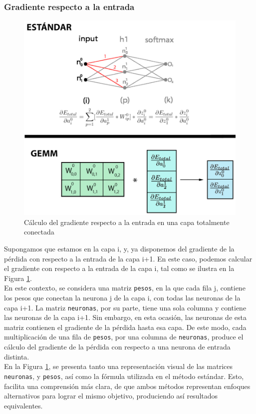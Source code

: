 \subsubsection{Gradiente respecto a la entrada}
\begin{figure}[H]
	\centering
	\includegraphics[scale=0.35]{imagenes/gemm_fully_back_input.jpg}  
	\caption{Cálculo del gradiente respecto a la entrada en una capa totalmente conectada}
	\label{fig:gemm_fully_back_input}
\end{figure}

Supongamos que estamos en la capa i, y, ya disponemos del gradiente de la pérdida con respecto a la entrada de la capa i+1. En este caso, podemos calcular el gradiente con respecto a la entrada de la capa i, tal como se ilustra en la Figura \ref{fig:gemm_fully_back_input}. \\
En este contexto, se considera una matriz \texttt{pesos}, en la que cada fila j, contiene los pesos que conectan la neurona j de la capa i, con todas las neuronas de la capa i+1. La matriz \texttt{neuronas}, por su parte, tiene una sola columna y contiene las neuronas de la capa i+1. Sin embargo, en esta ocasión, las neuronas de esta matriz contienen el gradiente de la pérdida hasta esa capa. De este modo, cada multiplicación de una fila de \texttt{pesos}, por una columna de \texttt{neuronas}, produce el cálculo del gradiente de la pérdida con respecto a una neurona de entrada distinta. \\
En la Figura \ref{fig:gemm_fully_back_input}, se presenta tanto una representación visual de las matrices \texttt{neuronas}, y \texttt{pesos}, así como la fórmula utilizada en el método estándar. Esto, facilita una comprensión más clara, de que ambos métodos representan enfoques alternativos para lograr el mismo objetivo, produciendo así resultados equivalentes.

